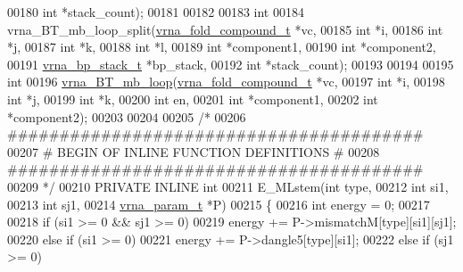\begin{DoxyCode}
00180                      \textcolor{keywordtype}{int}                  *stack\_count);
00181 
00182 
00183 \textcolor{keywordtype}{int}
00184 vrna\_BT\_mb\_loop\_split(\hyperlink{group__fold__compound_structvrna__fc__s}{vrna\_fold\_compound\_t}  *vc,
00185                       \textcolor{keywordtype}{int}                   *i,
00186                       \textcolor{keywordtype}{int}                   *j,
00187                       \textcolor{keywordtype}{int}                   *k,
00188                       \textcolor{keywordtype}{int}                   *l,
00189                       \textcolor{keywordtype}{int}                   *component1,
00190                       \textcolor{keywordtype}{int}                   *component2,
00191                       \hyperlink{group__data__structures_structvrna__bp__stack__s}{vrna\_bp\_stack\_t}       *bp\_stack,
00192                       \textcolor{keywordtype}{int}                   *stack\_count);
00193 
00194 
00195 \textcolor{keywordtype}{int}
00196 \hyperlink{group__loops_ga9cb520ddfd8b3a48089a7910b045d06b}{vrna\_BT\_mb\_loop}(\hyperlink{group__fold__compound_structvrna__fc__s}{vrna\_fold\_compound\_t}  *vc,
00197                 \textcolor{keywordtype}{int}                   *i,
00198                 \textcolor{keywordtype}{int}                   *j,
00199                 \textcolor{keywordtype}{int}                   *k,
00200                 \textcolor{keywordtype}{int}                   en,
00201                 \textcolor{keywordtype}{int}                   *component1,
00202                 \textcolor{keywordtype}{int}                   *component2);
00203 
00204 
00205 \textcolor{comment}{/*}
00206 \textcolor{comment}{ ########################################}
00207 \textcolor{comment}{ # BEGIN OF INLINE FUNCTION DEFINITIONS #}
00208 \textcolor{comment}{ ########################################}
00209 \textcolor{comment}{ */}
00210 PRIVATE INLINE \textcolor{keywordtype}{int}
00211 E\_MLstem(\textcolor{keywordtype}{int}          type,
00212          \textcolor{keywordtype}{int}          si1,
00213          \textcolor{keywordtype}{int}          sj1,
00214          \hyperlink{group__energy__parameters_structvrna__param__s}{vrna\_param\_t} *P)
00215 \{
00216   \textcolor{keywordtype}{int} energy = 0;
00217 
00218   \textcolor{keywordflow}{if} (si1 >= 0 && sj1 >= 0)
00219     energy += P->mismatchM[type][si1][sj1];
00220   \textcolor{keywordflow}{else} \textcolor{keywordflow}{if} (si1 >= 0)
00221     energy += P->dangle5[type][si1];
00222   \textcolor{keywordflow}{else} \textcolor{keywordflow}{if} (sj1 >= 0)

\end{DoxyCode}
